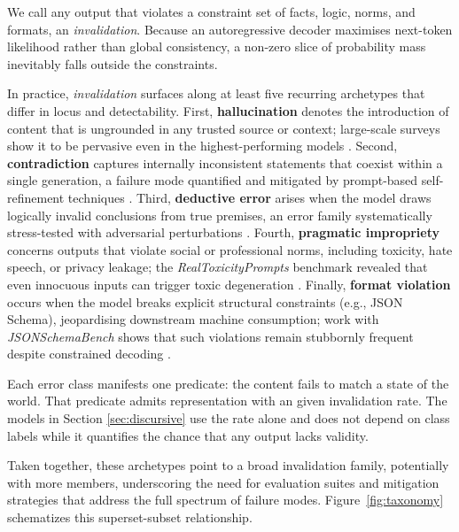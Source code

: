 \documentclass[12pt]{article}
\theoremstyle{definition}
\begin{document}
We call any output that violates a constraint set of facts, logic, norms, and formats,  
an \emph{invalidation}.  Because an autoregressive decoder maximises
next-token likelihood rather than global consistency, a non-zero slice
of probability mass inevitably falls outside the constraints. %


In practice, \emph{invalidation} surfaces along at least five recurring archetypes that differ in locus and detectability.  
First, \textbf{hallucination} denotes the introduction of content that is ungrounded in any trusted source or context; large-scale surveys show it to be pervasive even in the highest-performing models \parencite{huang2025survey}.  
Second, \textbf{contradiction} captures internally inconsistent statements that coexist within a single generation, a failure mode quantified and mitigated by prompt-based self-refinement techniques \parencite{mundler2023selfcontradiction}.  
Third, \textbf{deductive error} arises when the model draws logically invalid conclusions from true premises, an error family systematically stress-tested with adversarial perturbations \parencite{hoppe2025deductive}.  
Fourth, \textbf{pragmatic impropriety} concerns outputs that violate social or professional norms, including toxicity, hate speech, or privacy leakage; the \emph{RealToxicityPrompts} benchmark revealed that even innocuous inputs can trigger toxic degeneration \parencite{gehman2020realtoxicity}.  
Finally, \textbf{format violation} occurs when the model breaks explicit structural constraints (e.g., JSON Schema), jeopardising downstream machine consumption; work with \emph{JSONSchemaBench} shows that such violations remain stubbornly frequent despite constrained decoding \parencite{geng2025jsonschema}.

Each error class manifests one predicate: the content fails to match a state of the world. That predicate admits representation with an given invalidation rate. The models in Section \ref{sec:discursive} use the rate alone and does not depend on class labels while it quantifies the chance that any output lacks validity. 

Taken together, these archetypes point to a broad invalidation family, potentially with more members,  underscoring the need for evaluation suites and mitigation strategies that address the full spectrum of failure modes. Figure~\ref{fig:taxonomy} schematizes this superset-subset relationship. 
\end{document}
